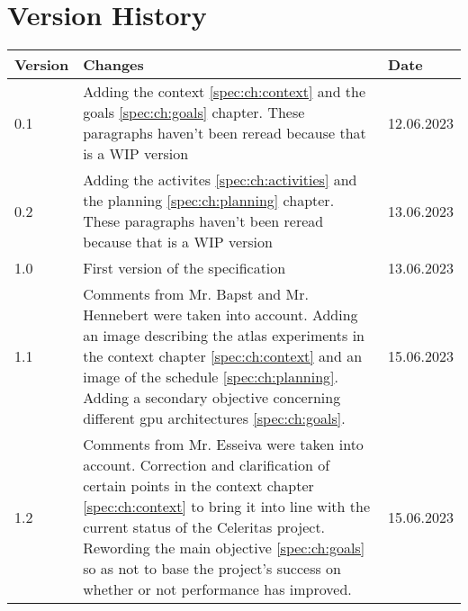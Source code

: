 \chapter{Version History}
\label{chap:spec-versions}

\begin{tabular}{|m{}|m{}|m{}|}
 \hline
 \textbf{Version} & \textbf{Changes} & \textbf{Date} \\ [0.5ex]
 \hline
 0.1 & Adding the context \ref{spec:ch:context} and the goals \ref{spec:ch:goals} chapter. These paragraphs haven't been reread because that is a WIP version & 12.06.2023  \\
 \hline
 0.2 & Adding the activites \ref{spec:ch:activities} and the planning \ref{spec:ch:planning} chapter. These paragraphs haven't been reread because that is a WIP version & 13.06.2023  \\
 \hline
 1.0 & First version of the specification & 13.06.2023  \\
 \hline
 1.1 &
 Comments from Mr. Bapst and Mr. Hennebert were taken into account.
 Adding an image describing the \acrshort{atlas} experiments in the context chapter \ref{spec:ch:context} and an image of the schedule \ref{spec:ch:planning}.
 Adding a secondary objective concerning different \acrshort{gpu} architectures \ref{spec:ch:goals}.
 & 15.06.2023  \\
 \hline
 1.2 &
 Comments from Mr. Esseiva were taken into account.
 Correction and clarification of certain points in the context chapter \ref{spec:ch:context} to bring it into line with the current status of the Celeritas project.
 Rewording the main objective \ref{spec:ch:goals} so as not to base the project's success on whether or not performance has improved.
 & 15.06.2023  \\
 \hline
\end{tabular}
